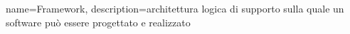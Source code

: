 {
	name={Framework},
	description={architettura logica di supporto sulla quale un software può essere progettato e realizzato}
}